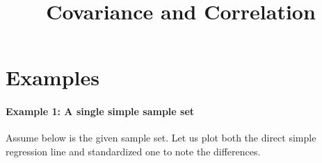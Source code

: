 \documentclass[float=false,crop=false]{standalone}
\title{Covariance and Correlation}
\begin{document}
    
    
    \maketitle
    
    

    
    \section{Examples}\label{examples}

\paragraph{Example 1: A single simple sample
set}\label{example-1-a-single-simple-sample-set}

Assume below is the given sample set. Let us plot both the direct simple
regression line and standardized one to note the differences.
\end{document}
